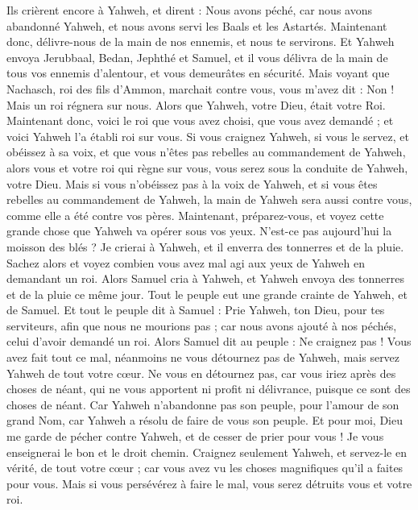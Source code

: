 \begin{multicols}{2}
Ils crièrent encore à Yahweh, et dirent : Nous avons péché, car nous avons abandonné Yahweh, et nous avons servi les Baals et les Astartés. Maintenant donc, délivre-nous de la main de nos ennemis, et nous te servirons.
Et Yahweh envoya Jerubbaal, Bedan, Jephthé et Samuel, et il vous délivra de la main de tous vos ennemis d'alentour, et vous demeurâtes en sécurité.
Mais voyant que Nachasch, roi des fils d'Ammon, marchait contre vous, vous m'avez dit : Non ! Mais un roi régnera sur nous. Alors que Yahweh, votre Dieu, était votre Roi.
Maintenant donc, voici le roi que vous avez choisi, que vous avez demandé ; et voici Yahweh l'a établi roi sur vous.
Si vous craignez Yahweh, si vous le servez, et obéissez à sa voix, et que vous n'êtes pas rebelles au commandement de Yahweh, alors vous et votre roi qui règne sur vous, vous serez sous la conduite de Yahweh, votre Dieu.
Mais si vous n'obéissez pas à la voix de Yahweh, et si vous êtes rebelles au commandement de Yahweh, la main de Yahweh sera aussi contre vous, comme elle a été contre vos pères.
Maintenant, préparez-vous, et voyez cette grande chose que Yahweh va opérer sous vos yeux.
N'est-ce pas aujourd'hui la moisson des blés ? Je crierai à Yahweh, et il enverra des tonnerres et de la pluie. Sachez alors et voyez combien vous avez mal agi aux yeux de Yahweh en demandant un roi.
Alors Samuel cria à Yahweh, et Yahweh envoya des tonnerres et de la pluie ce même jour. Tout le peuple eut une grande crainte de Yahweh, et de Samuel.
Et tout le peuple dit à Samuel : Prie Yahweh, ton Dieu, pour tes serviteurs, afin que nous ne mourions pas ; car nous avons ajouté à nos péchés, celui d'avoir demandé un roi.
Alors Samuel dit au peuple : Ne craignez pas ! Vous avez fait tout ce mal, néanmoins ne vous détournez pas de Yahweh, mais servez Yahweh de tout votre cœur.
Ne vous en détournez pas, car vous iriez après des choses de néant, qui ne vous apportent ni profit ni délivrance, puisque ce sont des choses de néant.
Car Yahweh n'abandonne pas son peuple, pour l'amour de son grand Nom, car Yahweh a résolu de faire de vous son peuple.
Et pour moi, Dieu me garde de pécher contre Yahweh, et de cesser de prier pour vous ! Je vous enseignerai le bon et le droit chemin.
Craignez seulement Yahweh, et servez-le en vérité, de tout votre cœur ; car vous avez vu les choses magnifiques qu'il a faites pour vous.
Mais si vous persévérez à faire le mal, vous serez détruits vous et votre roi.

\end{multicols}

